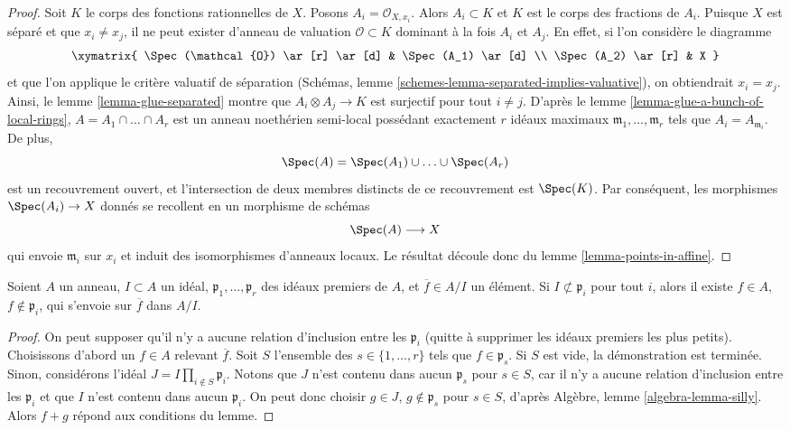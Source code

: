 \begin{proof}
Soit $K$ le corps des fonctions rationnelles de $X$.
Posons $A_i = \mathcal{O}_{X, x_i}$. Alors $A_i \subset K$ et $K$
est le corps des fractions de $A_i$. Puisque $X$ est séparé et que
$x_i \not = x_j$, il ne peut exister d'anneau de valuation $\mathcal{O} \subset K$
dominant à la fois $A_i$ et $A_j$. En effet, si l'on considère le
diagramme
$$
\xymatrix{
\Spec(\mathcal{O}) \ar[r] \ar[d] & \Spec(A_1) \ar[d] \\
\Spec(A_2) \ar[r] & X
}
$$
et que l'on applique le critère valuatif de séparation
(Schémas, lemme \ref{schemes-lemma-separated-implies-valuative}),
on obtiendrait $x_i = x_j$. Ainsi,
le lemme \ref{lemma-glue-separated} montre
que $A_i \otimes A_j \to K$ est surjectif pour tout $i \not = j$.
D'après le lemme \ref{lemma-glue-a-bunch-of-local-rings},
$A = A_1 \cap \ldots \cap A_r$ est un anneau noethérien
semi-local possédant exactement $r$ idéaux maximaux
$\mathfrak m_1, \ldots, \mathfrak m_r$ tels que $A_i = A_{\mathfrak m_i}$.
De plus,
$$
\Spec(A) = \Spec(A_1) \cup \ldots \cup \Spec(A_r)
$$
est un recouvrement ouvert, et l'intersection de deux membres distincts de ce
recouvrement est $\Spec(K)$. Par conséquent, les morphismes $\Spec(A_i) \to X$
donnés se recollent en un morphisme de schémas
$$
\Spec(A) \longrightarrow X
$$
qui envoie $\mathfrak m_i$ sur $x_i$ et induit des isomorphismes d'anneaux locaux.
Le résultat découle donc du lemme \ref{lemma-points-in-affine}.
\end{proof}

\begin{lemma}
\label{lemma-extra-silly}
Soient $A$ un anneau, $I \subset A$ un idéal,
$\mathfrak p_1, \ldots, \mathfrak p_r$ des idéaux premiers de $A$, et
$\overline{f} \in A/I$ un élément. Si $I \not \subset \mathfrak p_i$
pour tout $i$, alors il existe $f \in A$, $f \not \in \mathfrak p_i$,
qui s'envoie sur $\overline{f}$ dans $A/I$.
\end{lemma}

\begin{proof}
On peut supposer qu'il n'y a aucune relation d'inclusion entre les $\mathfrak p_i$
(quitte à supprimer les idéaux premiers les plus petits). Choisissons d'abord un $f \in A$ relevant
$\overline{f}$. Soit $S$ l'ensemble des $s \in \{1, \ldots, r\}$ tels
que $f \in \mathfrak p_s$. Si $S$ est vide, la démonstration est terminée. Sinon,
considérons l'idéal $J = I \prod_{i \not \in S} \mathfrak p_i$.
Notons que $J$ n'est contenu dans aucun $\mathfrak p_s$ pour $s \in S$,
car il n'y a aucune relation d'inclusion entre les $\mathfrak p_i$ et
que $I$ n'est contenu dans aucun $\mathfrak p_i$.
On peut donc choisir $g \in J$, $g \not \in \mathfrak p_s$ pour
$s \in S$, d'après Algèbre, lemme \ref{algebra-lemma-silly}.
Alors $f + g$ répond aux conditions du lemme.
\end{proof}

